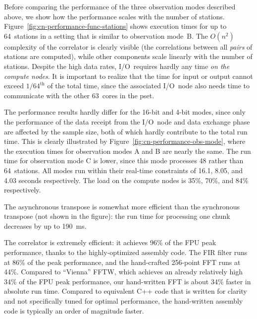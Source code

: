 \documentclass{sig-alternate}
\begin{document}
Before comparing the performance of the three observation modes described
above, we show how the performance scales with the number of stations.
Figure~\ref{fig:cn-performance-func-stations} shows execution times for up to
64~stations in a setting that is similar to observation mode~\textsf{B}.
The $O(n^2)$ complexity of the correlator is clearly visible (the correlations
between all \emph{pairs\/} of stations are computed), while other
components scale linearly with the number of stations.
Despite the high data rates, I/O~requires hardly any time \emph{on the compute nodes}.
It is important to realize that the time for input or output cannot exceed
$1/64^\mathrm{th}$ of the total time, since the associated I/O~node also needs
time to communicate with the other 63~cores in the pset.


The performance results hardly differ for the 16-bit and 4-bit modes,
since only the performance of the data receipt from the I/O~node and data
exchange phase are affected by the sample size, 
both of which hardly contribute to the total run time.
This is clearly illustrated by Figure~\ref{fig:cn-performance-obs-mode},
where the execution times for observation modes \textsf{A} and \textsf{B}
are nearly the same.
The run time for observation mode \textsf{C} is lower, since this mode
processes 48 rather than 64~stations.
All modes run within their real-time constraints of 16.1, 8.05, and 4.03
seconds respectively.
The load on the compute nodes is 35\%, 70\%, and 84\% respectively.

The asynchronous transpose is somewhat more efficient than the synchronous
transpose (not shown in the figure): the run time for processing one chunk
decreases by up to 190~ms.

The correlator is extremely efficient: it achieves 96\% of the FPU
peak performance, thanks to the highly-optimized assembly code.  The
FIR filter runs at 86\% of the peak performance, and the hand-crafted
256-point FFT runs at 44\%.  Compared to ``Vienna'' FFTW, which
achieves an already relatively high 34\% of the FPU peak performance,
our hand-written FFT is about 34\% faster in absolute run
time. Compared to equivalent C++ code that is written for clarity and
not specifically tuned for optimal performance, the hand-written
assembly code is typically an order of magnitude faster.
\end{document}
